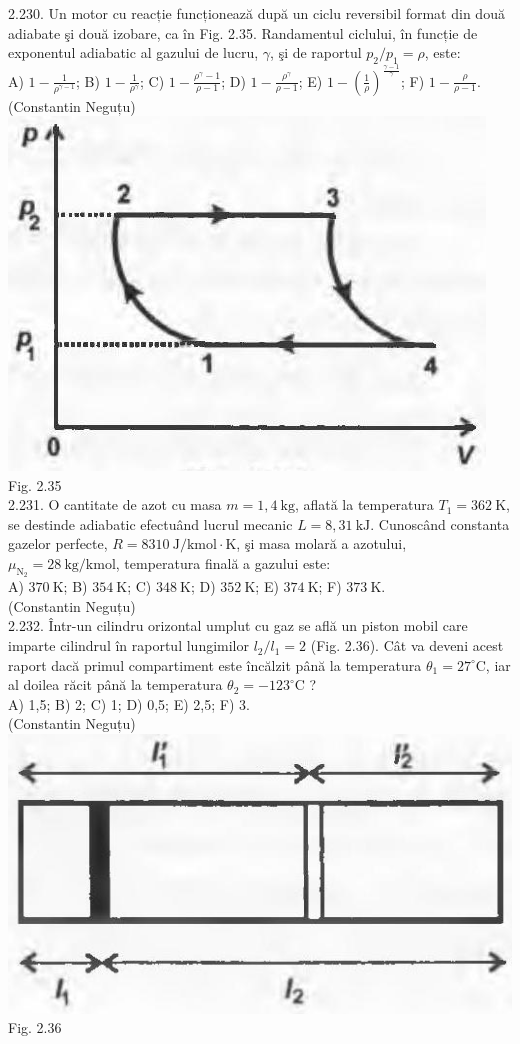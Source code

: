 2.230. Un motor cu reacție funcționează după un ciclu reversibil format din două adiabate şi două izobare, ca în Fig. 2.35. Randamentul ciclului, în funcție de exponentul adiabatic al gazului de lucru, $\gamma$, şi de raportul $p_{2} / p_{1}=\rho$, este:\\ A) $1-\frac{1}{\rho^{\gamma-1}}$; B) $1-\frac{1}{\rho^{\gamma}}$; C) $1-\frac{\rho^{\gamma}-1}{\rho-1}$; D) $1-\frac{\rho^{\gamma}}{\rho-1}$; E) $1-\left(\frac{1}{\rho}\right)^{\frac{\gamma-1}{\gamma}}$; F) $1-\frac{\rho}{\rho-1}$.\\ (Constantin Neguțu)\\ \includegraphics[width=0.4\linewidth]{images/2025_07_01_5b3ff9fa0d508c8e9f17g-125} Fig. 2.35\\

2.231. O cantitate de azot cu masa $m=1,4 \mathrm{~kg}$, aflată la temperatura $T_{1}=362 \mathrm{~K}$, se destinde adiabatic efectuând lucrul mecanic $L=8,31 \mathrm{~kJ}$. Cunoscând constanta gazelor perfecte, $R=8310 \mathrm{~J} / \mathrm{kmol} \cdot \mathrm{K}$, şi masa molară a azotului, $\mu_{\mathrm{N}_{2}}=28 \mathrm{~kg} / \mathrm{kmol}$, temperatura finală a gazului este:\\ A) $370 \mathrm{~K}$; B) $354 \mathrm{~K}$; C) $348 \mathrm{~K}$; D) $352 \mathrm{~K}$; E) $374 \mathrm{~K}$; F) $373 \mathrm{~K}$.\\ (Constantin Neguțu)\\

2.232. Într-un cilindru orizontal umplut cu gaz se află un piston mobil care imparte cilindrul în raportul lungimilor $l_{2} / l_{1}=2$ (Fig. 2.36). Cât va deveni acest raport dacă primul compartiment este încălzit până la temperatura $\theta_{1}=27^{\circ} \mathrm{C}$, iar al doilea răcit până la temperatura $\theta_{2}=-123^{\circ} \mathrm{C}$ ?\\ A) 1,5; B) 2; C) 1; D) 0,5; E) 2,5; F) 3.\\ (Constantin Neguțu)\\ \includegraphics[width=0.4\linewidth]{images/2025_07_01_5b3ff9fa0d508c8e9f17g-126(1)} Fig. 2.36\\


